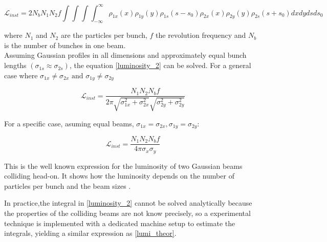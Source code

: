 \begin{equation}
  \mathcal{L}_{inst}= 2N_{b} N_{1}N_{2}f \int\int\int\int_{-\infty}^{\infty}  \rho_{1x}(x)\rho_{1y}(y)\rho_{1s}(s-s_{0})\rho_{2x}(x)\rho_{2y}(y)\rho_{2s}(s+s_{0}) dxdydsds_{0}
    \label{luminosity_2}
\end{equation}

where $N_{1}$ and $N_{2}$ are the particles per bunch, $f$ the revolution frequency and $N_{b}$ is the number of bunches in one beam.\\





Assuming Gaussian profiles in all dimensions and approximately equal bunch lengths $(\sigma_{1s}\approx \sigma_{2s})$, the equation \ref{luminosity_2} can be solved.
For a general case where $\sigma_{1x}\neq \sigma_{2x} \text{ and } \sigma_{1y}\neq \sigma_{2y}$

\begin{equation}
  \mathcal{L}_{inst}= \frac{N_{1} N_{2} N_{b}f }{2\pi \sqrt{\sigma_{1x}^{2}+\sigma_{2x}^{2}}\sqrt{\sigma_{2y}^{2}+\sigma_{2y}^{2}}}
  \label{lumi_general}
\end{equation}

For a specific case, asuming equal beams, $\sigma_{1x}= \sigma_{2x} ,\sigma_{1y}= \sigma_{2y}$:

\begin{equation}
  \mathcal{L}_{inst}= \frac{N_{1} N_{2} N_{b}f }{4\pi \sigma_{x} \sigma_{y}}
  \label{lumi_theor}
\end{equation}

This is the well known expression for the luminosity of two Gaussian beams colliding head-on. It shows how the luminosity depends on the number of particles per bunch and the beam sizes \cite{concept_of_luminosity}.

In practice,the integral in  \ref{luminosity_2} cannot be solved analytically because   the properties of the colliding beams are not know precisely, so a experimental technique is implemented with a dedicated machine setup to estimate the integrals, yielding a similar expression as \ref{lumi_theor}.

